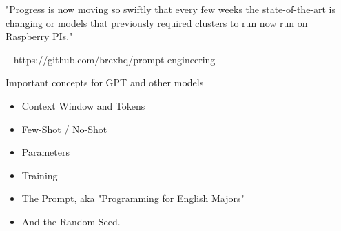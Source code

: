 \documentclass{beamer}
\begin{document}


\begin{frame}
	"Progress is now moving so swiftly that every few weeks the state-of-the-art is changing or models that previously required clusters to run now run on Raspberry PIs."
	 
	 -- https://github.com/brexhq/prompt-engineering
\end{frame}


\begin{frame}{Important concepts for GPT and other models}
	\begin{itemize}
		\item Context Window and Tokens
		\pause
		\item Few-Shot / No-Shot
		\pause
		\item Parameters
		\pause
		\item Training
		\pause 
		\item The Prompt, aka "Programming for English Majors"
		\pause
		\item And the Random Seed.
	\end{itemize}
\end{frame}
\end{document}
